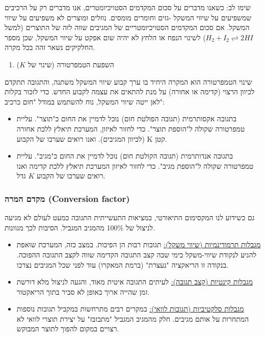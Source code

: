 \documentclass[
  hebrew,
  letterpaper,
  DIV=11,
  numbers=noendperiod]{scrreprt}
\providecommand{\tightlist}{%
  \setlength{\itemsep}{0pt}\setlength{\parskip}{0pt}}
\begin{document}
שימו לב: כשאנו מדברים על סכום המקדמים הסטויכיומטרים, אנו מדברים רק על
הרכיבים שמשפיעים על שיווי המשקל -גזים וחומרים מומסים. נוזלים ומוצרים לא
משפיעים על שיווי המשקל. אם סכום המקדמים הסטויכיומטריים של המגיבים שווה
לזה של התוצרים (למשל \(H_{2} + I_{2} \rightleftharpoons 2HI\)) לשינוי
הנפח או הלחץ לא יהיה שום אפקט על שיווי המשקל, שכן מספר החלקיקים נשאר זהה
בכל מקרה.

\begin{enumerate}
\def\labelenumi{\arabic{enumi}.}
\tightlist
\item
  השפעת הטמפרטורה (שינוי של \(K\))
\end{enumerate}

שינוי הטמפרטורה הוא המקרה היחיד בו ערך קבוע שיווי המשקל משתנה, והתגובה
תתקדם לכיוון הרצוי (קדימה או אחורה) על מנת להתאים את עצמה לקבוע החדש.
כדי לזכור בקלות לאן ייטה שיווי המשקל, נוח להשתמש במודל "חום כרכיב":

\begin{itemize}
\item
  בתגובה אקסותרמית (תגובה הפולטת חום) נוכל לדמיין את החום כ"תוצר". עליית
  טמפרטורה שקולה ל"הוספת תוצר". כדי לחזור לאיזון, המערכת תיאלץ ללכת
  אחורה (לכיוון המגיבים). ואנו רואים שערכו של הקבוע K קטן.
\item
  בתגובה אנדותרמית (תגובה הקולטת חום) נוכל לדמיין את החום כ"מגיב". עליית
  טמפרטורה שקולה ל"הוספת מגיב". כדי לחזור לאיזון המערכת תיאלץ ללכת קדימה
  ואנו רואים שערכו של הקבוע \(K\) גדל.
\end{itemize}

\subsubsection{מקדם המרה (Conversion
factor)}\label{ux5deux5e7ux5d3ux5dd-ux5d4ux5deux5e8ux5d4-conversion-factor}

גם כשידוע לנו המקסימום התיאורטי, במציאות התעשייתית התגובה כמעט לעולם לא
מגיעה לניצול של 100\% מהמגיב המגביל. הסיבות לכך מגוונות.

\begin{itemize}
\item
  \ul{מגבלות תרמודינמיות (שיווי משקל):} תגובות רבות הן הפיכות. במצב כזה,
  המערכת שואפת להגיע לנקודת שיווי-משקל כימי שבה קצב התגובה הקדימה שווה
  לקצב התגובה ההפוכה. בנקודה זו הריאקציה "נעצרת" (ברמת המאקרו) עוד לפני
  שכל המגיבים נצרכו.
\item
  \ul{מגבלות קינטיות (קצב תגובה):} לעיתים התגובה איטית מאוד, והגעה
  לניצול מלא דורשת זמן שהייה ארוך באופן לא סביר בתוך הריאקטור.
\item
  \ul{מגבלות סלקטיביות (תגובות לוואי):} במקרים רבים מתרחשות במקביל
  תגובות נוספות המתחרות על אותם מגיבים. חלק מהמגיב המגביל "מתבזבז" על
  יצירת תוצרי לוואי לא רצויים במקום להפוך לתוצר המבוקש.
\end{itemize}
\end{document}
